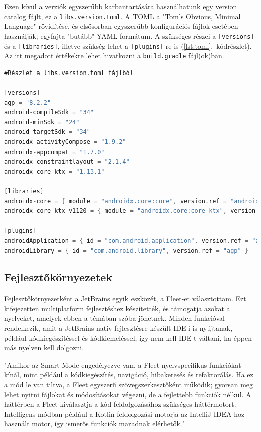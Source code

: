 Ezen kívül a verziók egyszerűbb karbantartására használhatunk egy version catalog fájlt, ez a \texttt{libs.version.toml}.  
A TOML a "Tom's Obvious, Minimal Language" rövidítése, és elsősorban egyszerűbb konfigurációs fájlok esetében használják; egyfajta "butább" YAML-formátum.  
A szükséges részei a \texttt{[versions]} és a \texttt{[libraries]}, illetve szükség lehet a \texttt{[plugins]}-re is (\ref{lst:toml}.~kódrészlet). Az itt megadott értékekre lehet hivatkozni a \texttt{build.gradle} fájl(ok)ban.

\begin{lstlisting}[caption={Version catalog}, label={lst:toml}, language=Kotlin]
#Részlet a libs.version.toml fájlból

[versions]
agp = "8.2.2"
android-compileSdk = "34"
android-minSdk = "24"
android-targetSdk = "34"
androidx-activityCompose = "1.9.2"
androidx-appcompat = "1.7.0"
androidx-constraintlayout = "2.1.4"
androidx-core-ktx = "1.13.1"

[libraries]
androidx-core = { module = "androidx.core:core", version.ref = "androidx-core-ktx" }
androidx-core-ktx-v1120 = { module = "androidx.core:core-ktx", version.ref = "coreKtx" }

[plugins]
androidApplication = { id = "com.android.application", version.ref = "agp" }
androidLibrary = { id = "com.android.library", version.ref = "agp" }
\end{lstlisting}

\subsection{Fejlesztőkörnyezetek}

Fejlesztőkörnyezetként a JetBrains egyik eszközét, a Fleet-et választottam.  
Ezt kifejezetten multiplatform fejlesztéshez készítették, és támogatja azokat a nyelveket, amelyek ebben a témában szóba jöhetnek.  
Minden funkcióval rendelkezik, amit a JetBrains natív fejlesztésre készült IDE-i is nyújtanak, például kódkiegészítéssel és kódkiemeléssel, így nem kell IDE-t váltani, ha éppen más nyelven kell dolgozni.

"Amikor az Smart Mode engedélyezve van, a Fleet nyelvspecifikus funkciókat kínál, mint például a kódkiegészítés, navigáció, hibakeresés és refaktorálás. Ha ez a mód le van tiltva, a Fleet egyszerű szövegszerkesztőként működik; gyorsan meg lehet nyitni fájlokat és módosításokat végezni, de a fejlettebb funkciók nélkül. A háttérben a Fleet kiválasztja a kód feldolgozásához szükséges háttérmotort. Intelligens módban például a Kotlin feldolgozási motorja az IntelliJ IDEA-hoz használt motor, így ismerős funkciók maradnak elérhetők." \cite{Fleet}

